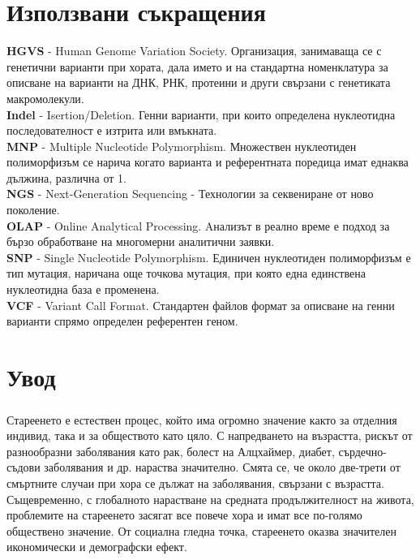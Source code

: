 \documentclass[pdftex,cyrillic,14pt,a4page,twoside,openright]{extreport}
\newcommand\blankpage{%
    \null
    \thispagestyle{empty}%
    \newpage}
\begin{document}
\afterpage{\blankpage}


\tableofcontents
\pagebreak

\setlength\parindent{0pt}

\chapter*{Използвани съкращения}
\textbf{HGVS} - Human Genome Variation Society. Организация, занимаваща се с генетични варианти при хората, дала името и на стандартна номенклатура за описване на варианти на ДНК, РНК, протеини и други свързани с генетиката макромолекули.\\
\textbf{Indel} - Isertion/Deletion. Генни варианти, при които определена нуклеотидна последователност е изтрита или вмъкната.\\
\textbf{MNP} - Multiple Nucleotide Polymorphism. Множествен нуклеотиден полиморфизъм се нарича когато варианта и референтната поредица имат еднаква дължина, различна от 1.\\
\textbf{NGS} -  Next-Generation Sequencing - Технологии за секвениране от ново поколение.\\
\textbf{OLAP} - Online Analytical Processing. Aнализът в реално време е подход за бързо обработване на многомерни аналитични заявки.\\
\textbf{SNP} - Single Nucleotide Polymorphism. Единичен нуклеотиден полиморфизъм е тип мутация, наричана още точкова мутация, при която една единствена нуклеотидна база е променена.\\
\textbf{VCF} - Variant Call Format. Стандартен файлов формат за описване на генни варианти спрямо определен референтен геном.\\

\chapter{Увод}
\paragraph{}

Стареенето е естествен процес, който има огромно значение както за отделния индивид, така и за обществото като цяло. С напредването на възрастта, рискът от разнообразни заболявания като рак, болест на Алцхаймер, диабет, сърдечно-съдови заболявания и др. нараства значително. Смята се, че около две-трети от смъртните случаи при хора се дължат на заболявания, свързани с възрастта. Същевременно, с глобалното нарастване на средната продължителност на живота, проблемите на стареенето засягат все повече хора и имат все по-голямо обществено значение. От социална гледна точка, стареенето оказва значителен икономически и демографски ефект.
\end{document}
